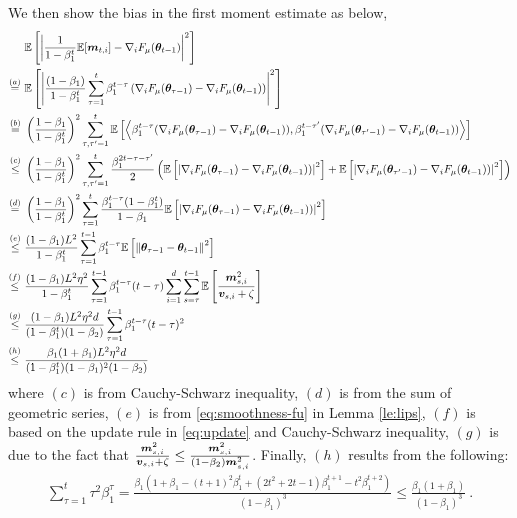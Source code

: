 \begin{appendices}
We then show the bias in the first moment estimate as below,
\begin{equation}
\begin{aligned}
&\mathbb{E}\left[\left|\frac{1}{1 - \beta_1^t}\mathbb{E}[{\bm{m}}_{t,i}] - \nabla_i F_{\mu}({\bm{\theta}}_{t-1})\right|^2\right] \\
\stackrel{(a)}{=}\,\,& \mathbb{E}\left[\left|\frac{(1 - \beta_1)}{1 - \beta_1^t} \sum_{\tau=1}^t \beta_1^{t-\tau}\left(\nabla_i F_{\mu}({\bm{\theta}}_{\tau-1}) - \nabla_i F_{\mu}({\bm{\theta}}_{t-1})\right)\right|^2\right] \\
\stackrel{(b)}{=}\,\,&\left(\frac{1-\beta_1}{1-\beta_1^t}\right)^2\sum_{\tau,\tau'=1}^t\mathbb{E}\left[\Big\langle \beta_1^{t-\tau}(\nabla_i F_{\mu}({\bm{\theta}}_{\tau-1}) - \nabla_i F_{\mu}({\bm{\theta}}_{t-1})), \beta_1^{t-\tau'}(\nabla_i F_{\mu}({\bm{\theta}}_{\tau'-1}) - \nabla_i F_{\mu}({\bm{\theta}}_{t-1}))\Big\rangle\right] \\
\stackrel{(c)}{\leq}\,\,& \left(\frac{1-\beta_1}{1-\beta_1^t}\right)^2\sum_{\tau,\tau'=1}^t \frac{\beta_1^{2t-\tau-\tau'}}{2}\left(\mathbb{E}\left[\left|\nabla_i F_{\mu}({\bm{\theta}}_{\tau-1}) - \nabla_i F_{\mu}({\bm{\theta}}_{t-1}))\right|^2\right] + \mathbb{E}\left[\left|\nabla_i F_{\mu}({\bm{\theta}}_{\tau'-1}) - \nabla_i F_{\mu}({\bm{\theta}}_{t-1}))\right|^2\right]\right) \\
\stackrel{(d)}{=}\,\,& \left(\frac{1-\beta_1}{1-\beta_1^t}\right)^2\sum_{\tau=1}^t \frac{\beta_1^{t-\tau}(1 - \beta_1^t)}{1-\beta_1} \mathbb{E}\left[\left|\nabla_i F_{\mu}({\bm{\theta}}_{\tau-1}) - \nabla_i F_{\mu}({\bm{\theta}}_{t-1}))\right|^2\right] \\
\stackrel{(e)}{\leq}\,\,&\frac{(1-\beta_1)L^2}{1-\beta_1^t} \sum_{\tau=1}^{t-1} \beta_1^{t-\tau}\mathbb{E}\left[\left\|{\bm{\theta}}_{\tau-1} - {\bm{\theta}}_{t-1}\right\|^2\right] \\
\stackrel{(f)}{\leq}\,\,&\frac{(1-\beta_1)L^2\eta^2}{1-\beta_1^t} \sum_{\tau=1}^{t-1} \beta_1^{t-\tau}(t-\tau)\sum_{i=1}^d \sum_{s=\tau}^{t-1}\mathbb{E}\left[\frac{{\bm{m}}_{s,i}^2}{{\bm{v}}_{s,i}+\zeta}\right] \\
\stackrel{(g)}{\leq}\,\,&\frac{(1-\beta_1)L^2\eta^2d}{(1-\beta_1^t)(1 - \beta_2)} \sum_{\tau=1}^{t-1} \beta_1^{t-\tau}(t-\tau)^2 \\
\stackrel{(h)}{\leq}\,\,&\frac{\beta_1(1+\beta_1)L^2\eta^2d}{(1-\beta_1^t)(1 - \beta_1)^2(1 - \beta_2)}
\end{aligned}
\end{equation}
where $(c)$ is from Cauchy-Schwarz inequality, $(d)$ is from the sum of geometric series, $(e)$ is from \eqref{eq:smoothness-fu} in Lemma \ref{le:lips}, $(f)$ is based on the update rule in \eqref{eq:update} and Cauchy-Schwarz inequality, $(g)$ is due to the fact that $\frac{{\bm{m}}^2_{s,i}}{{\bm{v}}_{s,i} + \zeta} \leq \frac{{\bm{m}}^2_{s,i}}{(1 - \beta_2){\bm{m}}^2_{s,i}}$. Finally, $(h)$ results from the following:
\begin{equation}
\begin{aligned}
\sum_{\tau=1}^{t} \tau^2\beta_1^{\tau} = \frac{\beta_1\left(1 + \beta_1 - (t+1)^2\beta_1^t + (2t^2 + 2t - 1)\beta_1^{t+1} - t^2\beta_1^{t+2}\right)}{(1 - \beta_1)^3} \leq \frac{\beta_1(1 + \beta_1)}{(1-\beta_1)^3} \ .
\end{aligned}
\end{equation}


\end{appendices}
